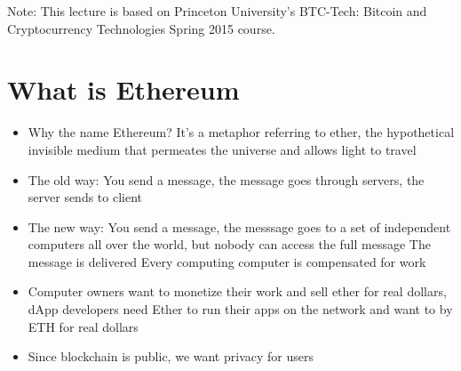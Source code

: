 \documentclass{article}
\begin{document}
\maketitle

Note: This lecture is based on Princeton University's BTC-Tech: Bitcoin and Cryptocurrency Technologies Spring 2015 course.

\section*{What is Ethereum}
\begin{itemize}
  \item Why the name Ethereum?
    \subitem It's a metaphor referring to ether, the hypothetical invisible medium that permeates the universe and allows light to travel
  \item The old way: You send a message, the message goes through servers, the server sends to client
  \item The new way: You send a message, the messsage goes to a set of independent computers all over the world, but nobody can access the full message
    The message is delivered
    \subitem Every computing computer is compensated for work
  \item Computer owners want to monetize their work and sell ether for real dollars, dApp developers need Ether to run their apps on the network and want to by ETH
    for real dollars
  \item Since blockchain is public, we want privacy for users
\end{itemize}
\end{document}
